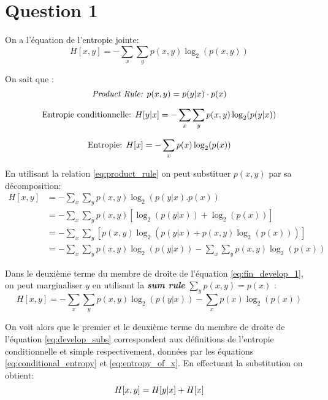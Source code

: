 \section{Question 1}
On a l'équation de l'entropie jointe:
$$H[x, y] = - \sum_x  \sum_y p(x, y) \log_2(p(x, y)) $$

On sait que :
\begin{equation}
    \textit{Product Rule: } p(x, y) = p(y|x)\cdot p(x) \label{eq:product_rule} \\
\end{equation}

\begin{equation}
    \text{Entropie conditionnelle: } H[y|x] = - \sum_x  \sum_y p(x, y) \log_2(p(y|x)) \label{eq:conditional_entropy}\\
\end{equation}

\begin{equation}
    \text{Entropie: } H[x] = - \sum_x  p(x) \log_2(p(x)) \label{eq:entropy_of_x}\\
\end{equation}

En utilisant la relation \ref{eq:product_rule} on peut substituer \(p(x,y)\) par sa décomposition:
\begin{equation}
    \begin{split}
        H[x, y]&= - \sum_x  \sum_y p(x, y) \log_2(p(y|x).p(x))\\
        &= - \sum_x  \sum_y p(x, y) [\log_2(p(y|x)) + \log_2(p(x))]\\
        &= - \sum_x  \sum_y \left[ p(x, y)\log_2(p(y|x) + p(x, y)\log_2(p(x))) \right]\\
        &= - \sum_x  \sum_y p(x, y) \log_2( p(y|x)) - \sum_x  \sum_y p(x, y) \log_2( p(x)) \label{eq:fin_develop_1}
    \end{split}
\end{equation}

Dans le deuxième terme du membre de droite de l'équation \ref{eq:fin_develop_1}, on peut marginaliser \(y\) en utilisant la \textbf{\textit{sum rule}} \(\sum_y p(x, y) =  p(x)\) :
\begin{equation}
    H[x, y] = - \sum_x  \sum_y p(x, y) \log_2( p(y|x)) - \sum_x p(x) \log_2( p(x)) \label{eq:develop_subs}
\end{equation}

On voit alors que le premier et le deuxième terme du membre de droite de l'équation \ref{eq:develop_subs} correspondent aux définitions de l'entropie conditionnelle et simple respectivement, données par les équations \ref{eq:conditional_entropy} et \ref{eq:entropy_of_x}. En effectuant la substitution on obtient:
\begin{equation*}
        H[x, y] = H[y|x] + H[x]\\
\end{equation*}


